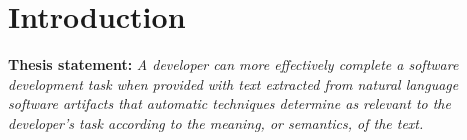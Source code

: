 \setcounter{chapter}{0}
\setcounter{rq}{1}


\chapter{Introduction}
\label{ch:introduction}


\textbf{Thesis statement:} \textit{
    A developer can more effectively complete a software development task when provided
    with text extracted from natural language software artifacts that 
    automatic techniques determine as relevant to the developer's task 
    according to the meaning, or semantics, of the text.    
}



\clearpage

